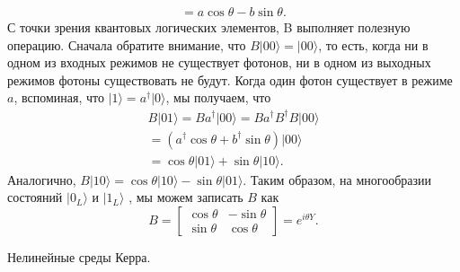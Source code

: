 \begin{multicols}{2}
{\begin{equation}
\begin{split}
                = a \cos{\theta} - b \sin{\theta}.
            \end{split}
        \end{equation}
        С точки зрения квантовых логических элементов, B выполняет полезную операцию. Сначала обратите внимание, что 
        $B\vert00\rangle=\vert00\rangle$, то есть, когда ни в одном из входных режимов не существует фотонов, ни в одном из выходных режимов фотоны существовать не будут. Когда один фотон существует в режиме $a$, вспоминая, что 
        $\vert1\rangle=a^{\dagger}\vert0\rangle$, мы получаем, что
        \begin{equation}
            \begin{split}
                B\vert01\rangle=Ba^{\dagger}\vert00\rangle=Ba^{\dagger}B^{\dagger}B\vert00\rangle \\
                =(a^{\dagger}\cos{\theta}+b^{\dagger}\sin{\theta})\vert00\rangle \\
                =\cos{\theta}\vert01\rangle+\sin{\theta}\vert10\rangle.
            \end{split}
        \end{equation}
        Аналогично, $B\vert10\rangle=\cos{\theta}\vert10\rangle-\sin{\theta}\vert01\rangle.$ Таким образом, на многообразии состояний $\vert0_{L}\rangle$ и $\vert1_{L}\rangle$ 
        , мы можем записать $B$ как
        \begin{equation}
            B=\begin{bmatrix}
                \cos{\theta}& -\sin{\theta}\\
                \sin{\theta}& \cos{\theta}
            \end{bmatrix}
            =e^{i\theta Y}.
        \end{equation}
        
        Нелинейные среды Керра.

}
\end{multicols}
